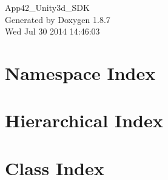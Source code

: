 \documentclass[twoside]{book}
\newcommand{\+}{\discretionary{\mbox{\scriptsize$\hookleftarrow$}}{}{}}
\newcommand{\clearemptydoublepage}{%
  \newpage{\pagestyle{empty}\cleardoublepage}%
}
\begin{document}
\hypersetup{pageanchor=false,
             bookmarks=true,
             bookmarksnumbered=true,
             pdfencoding=unicode
            }
\begin{titlepage}
\vspace*{7cm}
\begin{center}%
{\Large App42\+\_\+\+Unity3d\+\_\+\+S\+D\+K }\\
\vspace*{1cm}
{\large Generated by Doxygen 1.8.7}\\
\vspace*{0.5cm}
{\small Wed Jul 30 2014 14:46:03}\\
\end{center}
\end{titlepage}
\clearemptydoublepage
\tableofcontents
\clearemptydoublepage
{}
\hypersetup{pageanchor=true}

\chapter{Namespace Index}

\chapter{Hierarchical Index}

\chapter{Class Index}

\end{document}

